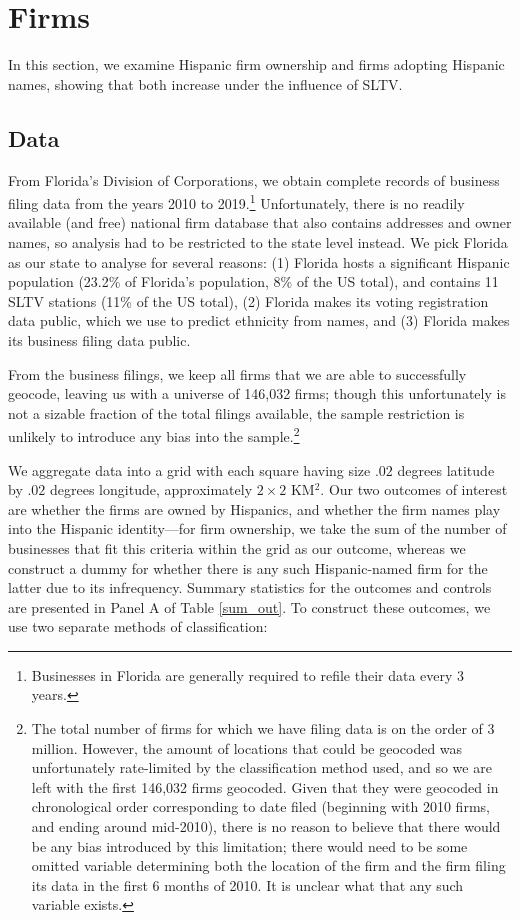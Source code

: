 \documentclass[11pt]{article}
\begin{document}

\section{Firms}\label{secfirm}

In this section, we examine Hispanic firm ownership and firms adopting Hispanic names, showing that both increase under the influence of SLTV. 

\subsection{Data}

From Florida's Division of Corporations, we obtain complete records of business filing data from the years 2010 to 2019.\footnote{ Businesses in Florida are generally required to refile their data every 3 years.} Unfortunately, there is no readily available (and free) national firm database that also contains addresses and owner names, so analysis had to be restricted to the state level instead. We pick Florida as our state to analyse for several reasons: (1) Florida hosts a significant Hispanic population (23.2\% of Florida's population, 8\% of the US total), and contains 11 SLTV stations (11\% of the US total), (2) Florida makes its voting registration data public, which we use to predict ethnicity from names, and (3) Florida makes its business filing data public. 

From the business filings, we keep all firms that we are able to successfully geocode, leaving us with a universe of 146,032 firms; though this unfortunately is not a sizable fraction of the total filings available, the sample restriction is unlikely to introduce any bias into the sample.\footnote{ The total number of firms for which we have filing data is on the order of 3 million. However, the amount of locations that could be geocoded was unfortunately rate-limited by the classification method used, and so we are left with the first 146,032 firms geocoded. Given that they were geocoded in chronological order corresponding to date filed (beginning with 2010 firms, and ending around mid-2010), there is no reason to believe that there would be any bias introduced by this limitation; there would need to be some omitted variable determining both the location of the firm and the firm filing its data in the first 6 months of 2010. It is unclear what that any such variable exists.} 

We aggregate data into a grid with each square having size $.02$ degrees latitude by $.02$ degrees longitude, approximately $2 \times 2$ KM$^2$. Our two outcomes of interest are whether the firms are owned by Hispanics, and whether the firm names play into the Hispanic identity---for firm ownership, we take the sum of the number of businesses that fit this criteria within the grid as our outcome, whereas we construct a dummy for whether there is any such Hispanic-named firm for the latter due to its infrequency. Summary statistics for the outcomes and controls are presented in Panel A of Table \ref{sum_out}. To construct these outcomes, we use two separate methods of classification:
\end{document}
